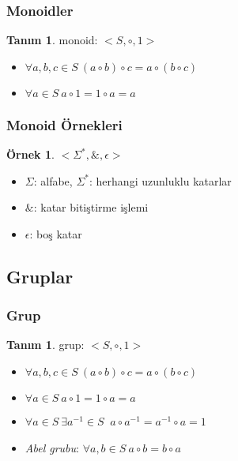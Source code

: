 \documentclass[dvipsnames]{beamer}
\theoremstyle{definition}
\newtheorem{tanim}[theorem]{Tanım}
\theoremstyle{example}
\newtheorem{ornek}[theorem]{Örnek}
\theoremstyle{plain}
\begin{document}
\begin{frame}
  \frametitle{Monoidler}

  \begin{tanim}
    \alert{monoid}: $<S,\circ,1>$

    \begin{itemize}
      \item $\forall a,b,c \in S~(a \circ b) \circ c = a \circ (b \circ c)$
      \item $\forall a \in S~a \circ 1 = 1 \circ a = a$
    \end{itemize}
  \end{tanim}
\end{frame}

\begin{frame}
  \frametitle{Monoid Örnekleri}

  \begin{ornek}
    $<\Sigma^*,\&,\epsilon>$

    \begin{itemize}
      \item $\Sigma$: alfabe, $\Sigma^*$: herhangi uzunluklu katarlar
      \item $\&$: katar bitiştirme işlemi
      \item $\epsilon$: boş katar
    \end{itemize}
  \end{ornek}
\end{frame}

\subsection{Gruplar}

\begin{frame}
  \frametitle{Grup}

  \begin{tanim}
    \alert{grup}: $<S,\circ,1>$

    \begin{itemize}
      \item $\forall a,b,c \in S~(a \circ b) \circ c = a \circ (b \circ c)$
      \item $\forall a \in S~a \circ 1 = 1 \circ a = a$
      \item $\forall a \in S~\exists a^{-1} \in S~$
        $a \circ a^{-1} = a^{-1} \circ a = 1$

      \pause
      \medskip
      \item \emph{Abel grubu}: $\forall a,b \in S~a \circ b = b \circ a$
    \end{itemize}
  \end{tanim}
\end{frame}
\end{document}
